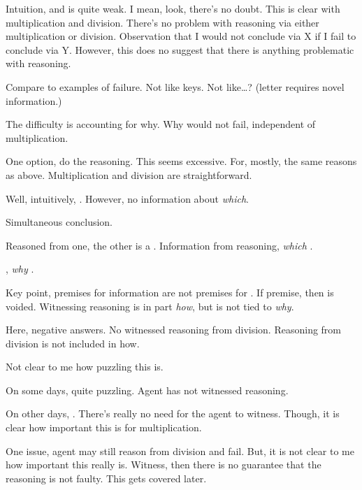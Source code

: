 \begin{note}[Give up on \zS{}]
  Intuition, and \zS{} is quite weak.
  I mean, look, there's no doubt.
  This is clear with multiplication and division.
  There's no problem with reasoning via either multiplication or division.
  Observation that I would not conclude via X if I fail to conclude via Y.
  However, this does no suggest that there is anything problematic with reasoning.

  Compare to examples of failure.
  Not like keys.
  Not like\dots? (letter requires novel information.)

  The difficulty is accounting for why.
  Why would not fail, independent of multiplication.
\end{note}

\begin{note}
  One option, do the reasoning.
  This seems excessive.
  For, mostly, the same reasons as above.
  Multiplication and division are straightforward.
\end{note}

\begin{note}[\fc{0} prior]
  Well, intuitively, .
  However, no information about \emph{which}.
\end{note}

\begin{note}[Simultaneous]
  Simultaneous conclusion.

  Reasoned from one, the other is a .
  Information from reasoning, \emph{which} .

  , \emph{why} \zS{}.

  Key point, premises for information are not premises for .
  If premise, then \zS{} is voided.
  Witnessing reasoning is in part \emph{how}, but is not tied to \emph{why}.

  Here, negative answers.
  No witnessed reasoning from division.
  Reasoning from division is not included in how.
\end{note}

\begin{note}
  Not clear to me how puzzling this is.

  On some days, quite puzzling.
  Agent has not witnessed reasoning.

  On other days, .
  There's really no need for the agent to witness.
  Though, it is clear how important this is for multiplication.
\end{note}

\begin{note}
  One issue, agent may still reason from division and fail.
  But, it is not clear to me how important this really is.
  Witness, then there is no guarantee that the reasoning is not faulty.
  This gets covered later.
\end{note}

